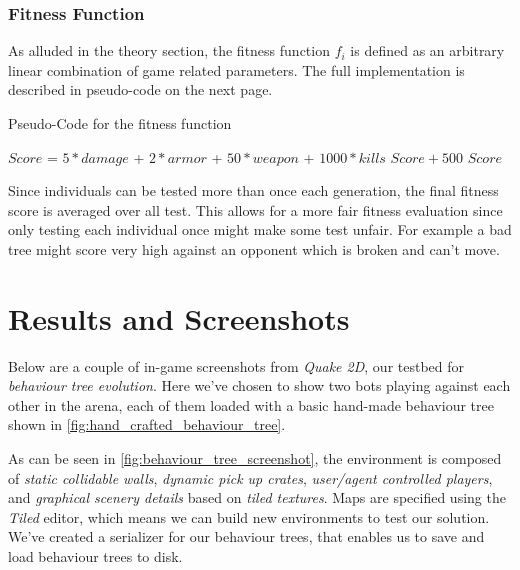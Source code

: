 \documentclass[a4paper, twocolumn]{article}
\begin{document}
        \subsubsection*{Fitness Function}
        As alluded in the theory section, the fitness function \(f_i\) is defined as an arbitrary linear combination of game related parameters. The full implementation is described in pseudo-code on the next page.
        \vspace{-0.4em}

        \begin{algorithm}[H]
            \caption{Pseudo-Code for the fitness function}
            \label{alg:fitness_function}
            \begin{algorithmic}
                $Score$ = $5 *damage$ + $2 * armor$ + $50 * weapon$ + $1000 * kills$
                    \RETURN $Score + 500$
                \ELSE
                    \RETURN $Score$
                \ENDIF
            \end{algorithmic}
        \end{algorithm}
        \vspace{-0.6em}

        Since individuals can be tested more than once each generation, the final fitness score is averaged over all test. This allows for a more fair fitness evaluation since only testing each individual once might make some test unfair. For example a bad tree might score very high against an opponent which is broken and can't move.

    \section{Results and Screenshots} \label{sec:results_and_screenshots}

        Below are a couple of in-game screenshots from \emph{Quake 2D}, our testbed for \emph{behaviour tree evolution}. Here we've chosen to show two bots playing against each other in the arena, each of them loaded with a basic hand-made behaviour tree shown in \cref{fig:hand_crafted_behaviour_tree}.

        As can be seen in \cref{fig:behaviour_tree_screenshot}, the environment is composed of \emph{static collidable walls}, \emph{dynamic pick up crates}, \emph{user/agent controlled players}, and \emph{graphical scenery details} based on \emph{tiled textures}. Maps are specified using the \emph{Tiled} editor, which means we can build new environments to test our solution. We've created a serializer for our behaviour trees, that enables us to save and load behaviour trees to disk.
\end{document}
